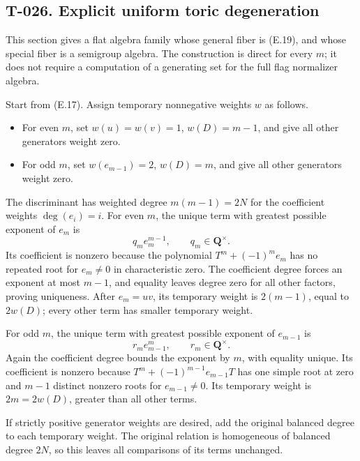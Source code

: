 \documentclass[
  10pt,
]{article}
\providecommand{\tightlist}{%
  \setlength{\itemsep}{0pt}\setlength{\parskip}{0pt}}
\providecommand{\tightlist}{\setlength{\itemsep}{0pt}\setlength{\parskip}{0pt}}
\begin{document}
\subsection{T-026. Explicit uniform toric
degeneration}\label{t-026.-explicit-uniform-toric-degeneration}

This section gives a flat algebra family whose general fiber is (E.19),
and whose special fiber is a semigroup algebra. The construction is
direct for every \(m\); it does not require a computation of a
generating set for the full flag normalizer algebra.

Start from (E.17). Assign temporary nonnegative weights \(w\) as
follows.

\begin{itemize}
\tightlist
\item
  For even \(m\), set \(w(u)=w(v)=1\), \(w(D)=m-1\), and give all other
  generators weight zero.
\item
  For odd \(m\), set \(w(e_{m-1})=2\), \(w(D)=m\), and give all other
  generators weight zero.
\end{itemize}

The discriminant has weighted degree \(m(m-1)=2N\) for the coefficient
weights \(\deg(e_i)=i\). For even \(m\), the unique term with greatest
possible exponent of \(e_m\) is \[
q_m e_m^{m-1},\qquad q_m\in\mathbf Q^\times.
\tag{E.27}
\] Its coefficient is nonzero because the polynomial \(T^m+(-1)^m e_m\)
has no repeated root for \(e_m\ne0\) in characteristic zero. The
coefficient degree forces an exponent at most \(m-1\), and equality
leaves degree zero for all other factors, proving uniqueness. After
\(e_m=uv\), its temporary weight is \(2(m-1)\), equal to \(2w(D)\);
every other term has smaller temporary weight.

For odd \(m\), the unique term with greatest possible exponent of
\(e_{m-1}\) is \[
r_m e_{m-1}^{m},\qquad r_m\in\mathbf Q^\times.
\tag{E.28}
\] Again the coefficient degree bounds the exponent by \(m\), with
equality unique. Its coefficient is nonzero because
\(T^m+(-1)^{m-1}e_{m-1}T\) has one simple root at zero and \(m-1\)
distinct nonzero roots for \(e_{m-1}\ne0\). Its temporary weight is
\(2m=2w(D)\), greater than all other terms.

If strictly positive generator weights are desired, add the original
balanced degree to each temporary weight. The original relation is
homogeneous of balanced degree \(2N\), so this leaves all comparisons of
its terms unchanged.
\end{document}
